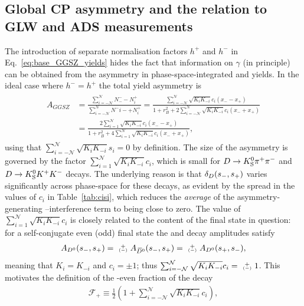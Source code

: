 
\subsection{Global CP asymmetry and the relation to GLW and ADS measurements} %
\label{sub:relation_to_glw_and_ads_measurements}



The introduction of separate normalisation factors $h^+$ and $h^-$ in Eq.~\eqref{eq:base_GGSZ_yields} hides the fact that information on $\gamma$ (in principle) can be obtained from the asymmetry in phase-space-integrated \Bp and \Bm yields. In the ideal case where $h^-=h^+$ the total yield asymmetry is 
\begin{align}\begin{split}\label{eq:A_GGSZ_global}
    A_{GGSZ} &= \frac{\sum_{i=-\mathcal N}^{\mathcal N} N^-_- - N^+_i}{\sum_{i=-\mathcal N}^{\mathcal N} N^-i- + N^+_i}
    = \frac{ \sum_{i=-\mathcal N}^{\mathcal N} \sqrt{K_iK_{-i}}c_i (x_- - x_+)}{1 + r_B^2 +2 \sum_{i=-\mathcal N}^{\mathcal N} \sqrt{K_iK_{-i}}c_i (x_- + x_+)} \\
    &=\frac{2 \sum_{i=1}^{\mathcal N} \sqrt{K_iK_{-i}}c_i (x_- - x_+)}{1 + r_B^2 +4 \sum_{i=1}^{\mathcal N} \sqrt{K_iK_{-i}}c_i (x_- + x_+) },
\end{split}\end{align}
using that $\sum_{i=-\mathcal N}^{\mathcal N} \sqrt{K_iK_{-i}}s_i=0$ by definition. The size of the asymmetry is governed by the factor $\sum_{i=1}^{\mathcal N} \sqrt{K_iK_{-i}}c_i$, which is small for ${{D}\rightarrow{\ensuremath{{K}^0_{\mathrm{S}}}}{\ensuremath{{\pi}^+}}{\ensuremath{{\pi}^-}}}$ and ${D}\rightarrow{\ensuremath{{K}^0_{\mathrm{S}}}}{\ensuremath{{K}^+}}{\ensuremath{{K}^-}}$ decays. The underlying reason is that $\delta_D(s_-, s_+)$ varies significantly across phase-space for these decays, as evident by the spread in the values of $c_i$ in Table~\ref{tab:cisi}, which reduces the \emph{average} of the asymmetry-generating \Dz--\Dzb interference term to being close to zero. The value of $\sum_{i=1}^{\mathcal N} \sqrt{K_iK_{-i}}c_i$ is closely related to the \CP content of the final state in question: for a self-conjugate \CP even (odd) final state the \Dz and \Dzb decay amplitudes satisfy
\begin{align}
    {A_\Dz(\sm, \sp)=\varpm A_\Dzb(\sm, \sp)=\varpm A_\Dz(\sp, \sm)},
\end{align}
 meaning that $K_i=K_{-i}$ and $c_i=\pm1$; thus $\sum_{i=-\mathcal N}^{\mathcal N} \sqrt{K_iK_{-i}}c_i= \varpm 1$. This motivates the definition of the \CP-even fraction of the decay
\begin{align}\label{eq:Fplus_global}
    \mathcal F_+ \equiv \frac{1}{2}\left(1 + \sum_{i=-\mathcal N}^{\mathcal N} \sqrt{K_i K_{-i}}c_i\right),
\end{align}
